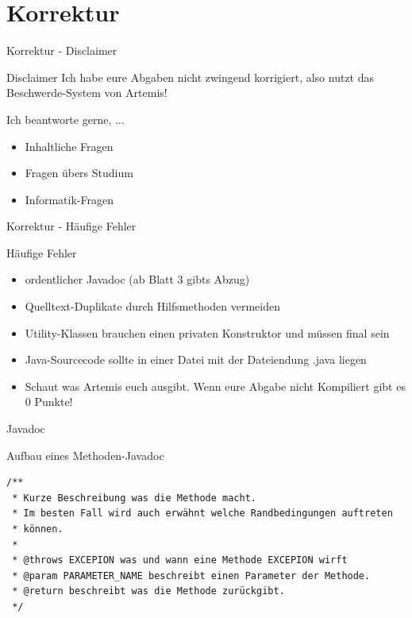 \documentclass[aspectratio=169]{beamer}
\begin{document}
\section{Korrektur}
\begin{frame}{Korrektur - Disclaimer}
  \begin{alertblock}{Disclaimer}
    Ich habe eure Abgaben nicht zwingend korrigiert, also nutzt das Beschwerde-System von Artemis!
  \end{alertblock}

  \begin{block}{Ich beantworte gerne, ...}
    \begin{itemize}
      \item Inhaltliche Fragen
      \item Fragen übers Studium
      \item Informatik-Fragen
    \end{itemize}
  \end{block}
\end{frame}

\begin{frame}{Korrektur - Häufige Fehler}
  \begin{block}{Häufige Fehler}
    \begin{itemize}
      \pause
      \item ordentlicher Javadoc (\color{alertcolor}ab Blatt 3 gibts Abzug\color{FGround})
      \pause
      \item Quelltext-Duplikate durch Hilfsmethoden vermeiden
      \pause
      \item Utility-Klassen brauchen einen privaten Konstruktor und müssen \color{keywordcolor}final \color{FGround}sein
      \pause
      \item Java-Sourcecode sollte in einer Datei mit der Dateiendung .java liegen
      \pause
      \item Schaut was Artemis euch ausgibt. Wenn eure Abgabe nicht Kompiliert gibt es 0 Punkte!
    \end{itemize}
  \end{block}
\end{frame}

\begin{frame}[fragile]{Javadoc}
  \begin{exampleblock}{Aufbau eines Methoden-Javadoc}
    \begin{lstlisting}
/**
 * Kurze Beschreibung was die Methode macht.
 * Im besten Fall wird auch erwähnt welche Randbedingungen auftreten
 * können.
 *
 * @throws EXCEPION was und wann eine Methode EXCEPION wirft
 * @param PARAMETER_NAME beschreibt einen Parameter der Methode.
 * @return beschreibt was die Methode zurückgibt.
 */
    \end{lstlisting}
  \end{exampleblock}
\end{frame}
\end{document}
